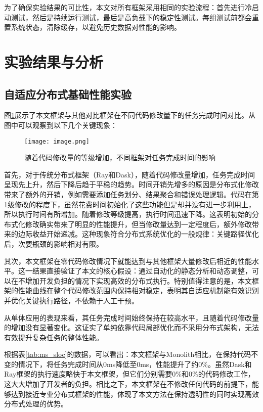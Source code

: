 为了确保实验结果的可比性，本文对所有框架采用相同的实验流程：首先进行冷启动测试，然后是持续运行测试，最后是高负载下的稳定性测试。每组测试前都会重置系统状态，清除缓存，以避免历史数据对性能的影响。

\section{实验结果与分析}

\subsection{自适应分布式基础性能实验}


图\ref{fig:ms_sloc}展示了本文框架与其他对比框架在不同代码修改量下的任务完成时间对比。从图中可以观察到以下几个关键现象：

\begin{figure}[htbp]
    \centering
    \texttt{[image: image.png]}
    \caption{随着代码修改量的等级增加，不同框架对任务完成时间的影响}
    \label{fig:ms_sloc}
\end{figure}

首先，对于传统分布式框架（Ray和Dask），随着代码修改量增加，任务完成时间呈现先上升，然后下降后趋于平稳的趋势。时间开销先增多的原因是分布式化修改带来了额外的开销，例如需要添加任务划分、结果聚合和错误处理逻辑。代码在第1级修改的程度下，虽然花费时间初始化了这些功能但是却并没有进一步利用上，所以执行时间有所增加。随着修改等级提高，执行时间迅速下降。这表明初始的分布式化修改确实带来了明显的性能提升，但当修改量达到一定程度后，额外修改带来的边际收益开始递减。这种现象符合分布式系统优化的一般规律：关键路径优化后，次要瓶颈的影响相对有限。

其次，本文框架在零代码修改情况下就能达到与其他框架大量修改后相近的性能水平。这一结果直接验证了本文的核心假设：通过自动化的静态分析和动态调整，可以在不增加开发负担的情况下实现高效的分布式执行。特别值得注意的是，本文框架的性能曲线在整个代码修改范围内保持相对稳定，表明其自适应机制能有效识别并优化关键执行路径，不依赖于人工干预。

从单体应用的表现来看，其任务完成时间始终保持在较高水平，且随着代码修改量的增加没有显著变化。这证实了单纯依靠代码局部优化而不采用分布式架构，无法有效提升复杂任务的整体性能。


根据表\ref{tab:ms_sloc}的数据，可以看出：本文框架与Monolith相比，在保持代码不变的情况下，将任务完成时间从0ms降低至0ms，性能提升了约0\%。虽然Dask和Ray框架的执行速度略快于本文框架，但它们分别需要0\%和0\%的代码修改工作，这大大增加了开发者的负担。相比之下，本文框架在不修改任何代码的前提下，能够达到接近专业分布式框架的性能，体现了本文方法在保持透明性的同时实现高效分布式处理的优势。


